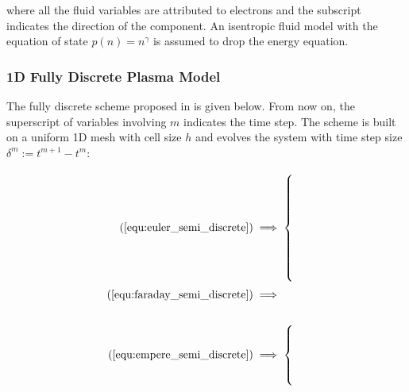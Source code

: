 \documentclass{article}
\begin{document}
where all the fluid variables are attributed to electrons and the subscript indicates the direction of the component. An isentropic fluid model with the equation of state $p(n) = n^\gamma$ is assumed to drop the energy equation. 

\subsubsection{1D Fully Discrete Plasma Model} \label{sec:1d_fully_discrete_model}
The fully discrete scheme proposed in \cite{degond_2012} is given below. From now on, the superscript of variables involving $m$ indicates the time step. The scheme is built on a uniform 1D mesh with cell size $h$ and evolves the system with time step size $\delta^m := t^{m+1} - t^m$:  

\begin{minipage}{0.1\textwidth}
\vspace{0.5cm}
    \begin{align*}
        (\ref{equ:euler_semi_discrete}) &\implies \begin{cases}
         \\
         \\
         \\
         \\
         \\
         \\
         \\
        \end{cases} \\
        (\ref{equ:faraday_semi_discrete}) & \implies \\
        \\
        (\ref{equ:empere_semi_discrete}) & \implies \begin{cases}
        \\ 
        \\
        \\
        \\
        \end{cases}
    \end{align*}
\end{minipage}
\end{document}

